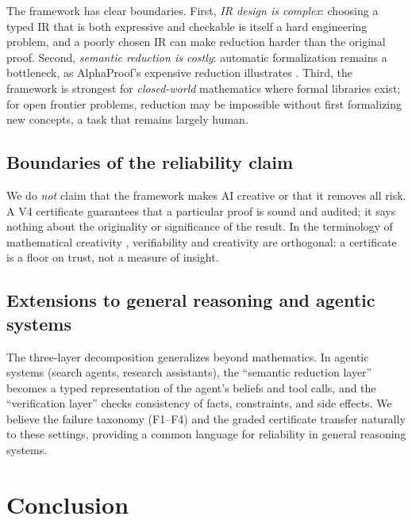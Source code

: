 \documentclass[11pt,a4paper]{article}
\theoremstyle{definition}
\theoremstyle{plain}
\begin{document}
The framework has clear boundaries. First, \emph{IR design is complex}: choosing a typed IR that is both
expressive and checkable is itself a hard engineering problem, and a poorly chosen IR can make reduction
harder than the original proof. Second, \emph{semantic reduction is costly}: automatic formalization
remains a bottleneck, as AlphaProof's expensive reduction illustrates \cite{hubert2026}. Third, the
framework is strongest for \emph{closed-world} mathematics where formal libraries exist; for open
frontier problems, reduction may be impossible without first formalizing new concepts, a task that
remains largely human.

\subsection{Boundaries of the reliability claim}
\label{sec:boundaries}

We do \emph{not} claim that the framework makes AI creative or that it removes all risk. A V4 certificate
guarantees that a particular proof is sound and audited; it says nothing about the originality or
significance of the result. In the terminology of mathematical creativity \cite{chen2025deepmath},
verifiability and creativity are orthogonal: a certificate is a floor on trust, not a measure of insight.

\subsection{Extensions to general reasoning and agentic systems}
\label{sec:extensions}

The three-layer decomposition generalizes beyond mathematics. In agentic systems (search agents,
research assistants), the ``semantic reduction layer'' becomes a typed representation of the agent's
beliefs and tool calls, and the ``verification layer'' checks consistency of facts, constraints, and
side effects. We believe the failure taxonomy (F1--F4) and the graded certificate transfer naturally to
these settings, providing a common language for reliability in general reasoning systems.

\section{Conclusion}
\label{sec:concl}
\end{document}
